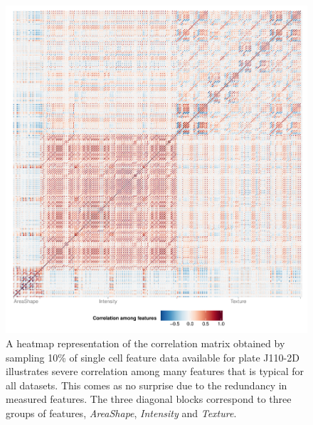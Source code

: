 \begin{knitrout}
\color{fgcolor}\begin{figure}

{\centering \includegraphics[width=\maxwidth]{figures/R/correlation-heatmap-analysis-correlation-1} 

}

\caption[Heatmap representation of correlation among single cell features.]{A heatmap representation of the correlation matrix obtained by sampling 10\% of single cell feature data available for plate J110-2D illustrates severe correlation among many features that is typical for all datasets. This comes as no surprise due to the redundancy in measured features. The three diagonal blocks correspond to three groups of features, \textit{AreaShape}, \textit{Intensity} and \textit{Texture}.}\label{fig:analysis-correlation}
\end{figure}


\end{knitrout}


